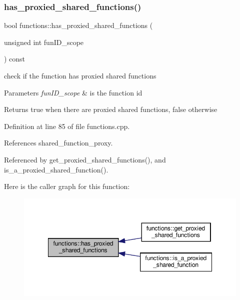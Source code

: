\subsubsection{\texorpdfstring{has\+\_\+proxied\+\_\+shared\+\_\+functions()}{has\_proxied\_shared\_functions()}}
{\footnotesize\ttfamily bool functions\+::has\+\_\+proxied\+\_\+shared\+\_\+functions (\begin{DoxyParamCaption}\item[{unsigned int}]{fun\+I\+D\+\_\+scope }\end{DoxyParamCaption}) const}



check if the function has proxied shared functions 


\begin{DoxyParams}{Parameters}
{\em fun\+I\+D\+\_\+scope} & is the function id \\
\hline
\end{DoxyParams}
\begin{DoxyReturn}{Returns}
true when there are proxied shared functions, false otherwise 
\end{DoxyReturn}


Definition at line 85 of file functions.\+cpp.



References shared\+\_\+function\+\_\+proxy.



Referenced by get\+\_\+proxied\+\_\+shared\+\_\+functions(), and is\+\_\+a\+\_\+proxied\+\_\+shared\+\_\+function().

Here is the caller graph for this function\+:
\nopagebreak
\begin{figure}[H]
\begin{center}
\leavevmode
\includegraphics[width=348pt]{dd/d03/classfunctions_a97f9fd743ecd37a8538880ecd21e09c7_icgraph}
\end{center}
\end{figure}
\mbox{\label{classfunctions_ae65e0b90457b7af2ed1af8f093797e64}} 
